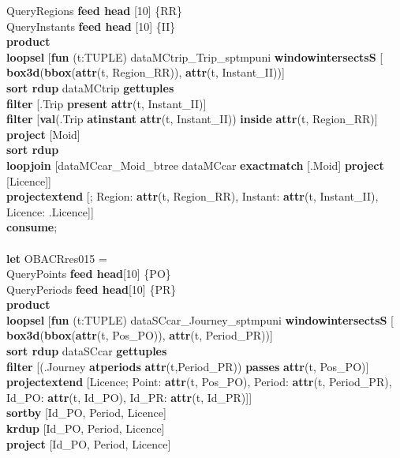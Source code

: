 \documentclass[a4paper]{article}
\newcommand{\op}[1]{\textbf{#1}}
\begin{document}
\begin{scriptsize}
\begin{tabbing}
\>QueryRegions  \op{feed head} [10] \{RR\}\\
\>QueryInstants \op{feed head} [10] \{II\}\\
\>\op{product}\\
\>\op{loopsel} [\op{fun} (t:TUPLE) dataMCtrip\_Trip\_sptmpuni \op{windowintersectsS} [\\ 
\>\>\>\>\op{box3d}(\op{bbox}(\op{attr}(t, Region\_RR)), \op{attr}(t, Instant\_II))]\\
\>\>\op{sort rdup} dataMCtrip \op{gettuples}\\
\>\>\op{filter} [.Trip \op{present} \op{attr}(t, Instant\_II)]\\
\>\>\op{filter} [\op{val}(.Trip \op{atinstant} \op{attr}(t, Instant\_II)) \op{inside} \op{attr}(t, Region\_RR)]\\
\>\>\op{project} [Moid]\\
\>\>\op{sort rdup}\\
\>\>\op{loopjoin} [dataMCcar\_Moid\_btree dataMCcar \op{exactmatch} [.Moid] \op{project} [Licence]]\\
\>\>\op{projectextend} [; Region: \op{attr}(t, Region\_RR), Instant: \op{attr}(t, Instant\_II), Licence: .Licence]]\\
\op{consume};\\
\\
\op{let} OBACRres015 =\\
\>QueryPoints  \op{feed head}[10] \{PO\}\\
\>QueryPeriods \op{feed head}[10] \{PR\}\\
\>\op{product}\\
\>\op{loopsel} [\op{fun} (t:TUPLE) dataSCcar\_Journey\_sptmpuni \op{windowintersectsS} [\\ 
\>\>\>\>\op{box3d}(\op{bbox}(\op{attr}(t, Pos\_PO)), \op{attr}(t, Period\_PR))]\\
\>\>\op{sort rdup} dataSCcar \op{gettuples}\\
\>\>\op{filter} [(.Journey \op{atperiods} \op{attr}(t,Period\_PR)) \op{passes} \op{attr}(t, Pos\_PO)]\\
\>\>\op{projectextend} [Licence; Point: \op{attr}(t, Pos\_PO), Period: \op{attr}(t, Period\_PR),\\
\>\>\>\>Id\_PO: \op{attr}(t, Id\_PO), Id\_PR: \op{attr}(t, Id\_PR)]]\\
\>\op{sortby} [Id\_PO, Period, Licence]\\
\>\op{krdup} [Id\_PO, Period, Licence]\\
\>\op{project} [Id\_PO, Period, Licence]\\

\end{tabbing}
\end{scriptsize}
\end{document}
